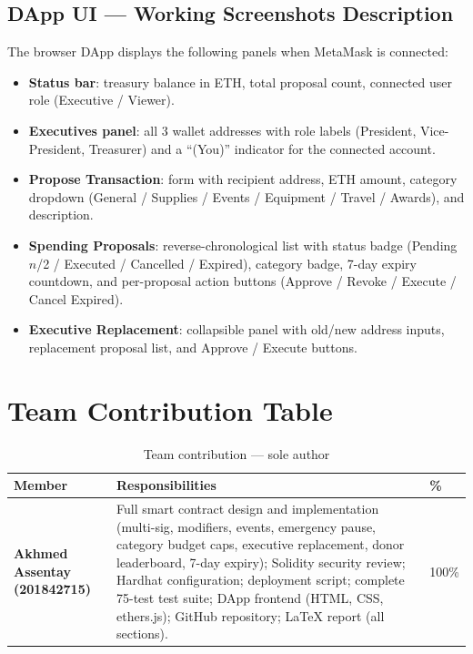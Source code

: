 \documentclass[12pt,a4paper]{article}
\begin{document}
\subsection{DApp UI — Working Screenshots Description}

The browser DApp displays the following panels when MetaMask is connected:

\begin{itemize}
  \item \textbf{Status bar}: treasury balance in ETH, total proposal count, connected user role (Executive / Viewer).
  \item \textbf{Executives panel}: all 3 wallet addresses with role labels (President, Vice-President, Treasurer) and a ``(You)'' indicator for the connected account.
  \item \textbf{Propose Transaction}: form with recipient address, ETH amount, category dropdown (General / Supplies / Events / Equipment / Travel / Awards), and description.
  \item \textbf{Spending Proposals}: reverse-chronological list with status badge (Pending $n$/2 / Executed / Cancelled / Expired), category badge, 7-day expiry countdown, and per-proposal action buttons (Approve / Revoke / Execute / Cancel Expired).
  \item \textbf{Executive Replacement}: collapsible panel with old/new address inputs, replacement proposal list, and Approve / Execute buttons.
\end{itemize}

\section{Team Contribution Table}

\begin{table}[h]
  \centering
  \begin{tabularx}{\linewidth}{>{\bfseries}lXl}
    \toprule
    Member & Responsibilities & \% \\
    \midrule
    Akhmed Assentay \newline (201842715) &
      Full smart contract design and implementation (multi-sig, modifiers, events,
      emergency pause, category budget caps, executive replacement, donor leaderboard,
      7-day expiry); Solidity security review; Hardhat configuration; deployment script;
      complete 75-test test suite; DApp frontend (HTML, CSS, ethers.js);
      GitHub repository; LaTeX report (all sections). &
      100\% \\
    \bottomrule
  \end{tabularx}
  \caption{Team contribution — sole author}
\end{table}
\end{document}
